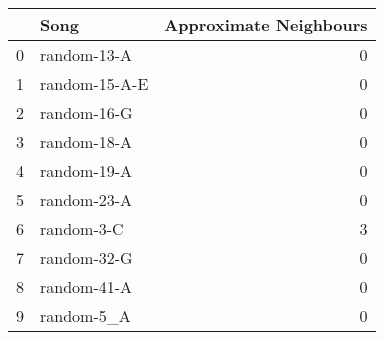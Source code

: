 \begin{tabular}{llr}
\toprule
 & Song & Approximate Neighbours \\
\midrule
0 & random-13-A & 0 \\
1 & random-15-A-E & 0 \\
2 & random-16-G & 0 \\
3 & random-18-A & 0 \\
4 & random-19-A & 0 \\
5 & random-23-A & 0 \\
6 & random-3-C & 3 \\
7 & random-32-G & 0 \\
8 & random-41-A & 0 \\
9 & random-5_A & 0 \\
\bottomrule
\end{tabular}
